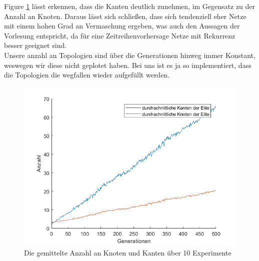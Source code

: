 \documentclass{hbrs-ecta-report}
\begin{document}
Figure \ref{fig:KantenUndKnoten} lässt erkennen, dass die Kanten deutlich zunehmen, im Gegensatz zu der Anzahl an Knoten. Daraus lässt sich schließen, dass sich tendenziell eher Netze mit einem hohen Grad an Vermaschung ergeben, was auch den Aussagen der Vorlesung entspricht, da für eine Zeitreihenvorhersage Netze mit Rekurrenz besser geeignet sind.\\
Unsere anzahl an Topologien sind über die Generationen hinweg immer Konstant, weswegen wir diese nicht geplotet haben. Bei uns ist es ja so implementiert, dass die Topologien die wegfallen wieder aufgefüllt werden.
\begin{figure}[h!]
	\includegraphics[width=\linewidth]{img/KantenUndKnoten}
	\caption{Die gemittelte Anzahl an Knoten und Kanten über 10 Experimente}
	\label{fig:KantenUndKnoten}
\end{figure}
\end{document}
